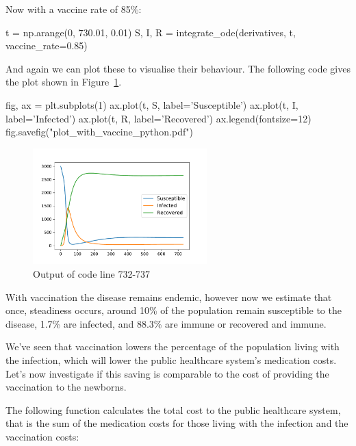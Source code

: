 Now with a vaccine rate of 85\%:

\begin{pyin}
t = np.arange(0, 730.01, 0.01)
S, I, R = integrate_ode(derivatives, t, vaccine_rate=0.85)
\end{pyin}

And again we can plot these to visualise their behaviour. The following code
gives the plot shown in Figure~\ref{fig:plot_with_vaccine}.

\begin{pyin}
fig, ax = plt.subplots(1)
ax.plot(t, S, label='Susceptible')
ax.plot(t, I, label='Infected')
ax.plot(t, R, label='Recovered')
ax.legend(fontsize=12)
fig.savefig("plot_with_vaccine_python.pdf")
\end{pyin}

\begin{figure}
\begin{center}
\includegraphics[width=0.6\textwidth]{./assets/plot_with_vaccine_python.pdf}
\end{center}
\caption{Output of code line 732-737}
\label{fig:plot_with_vaccine}
\end{figure}

With vaccination the disease remains endemic, however now we estimate that once,
steadiness occurs, around 10\% of the population remain susceptible to the
disease, 1.7\% are infected, and 88.3\% are immune or recovered and immune.

We've seen that vaccination lowers the percentage of the population living with
the infection, which will lower the public healthcare system's medication costs.
Let's now investigate if this saving is comparable to the cost of providing the
vaccination to the newborns.

The following function calculates the total cost to the public healthcare
system, that is the sum of the medication costs for those living with the
infection and the vaccination costs:

